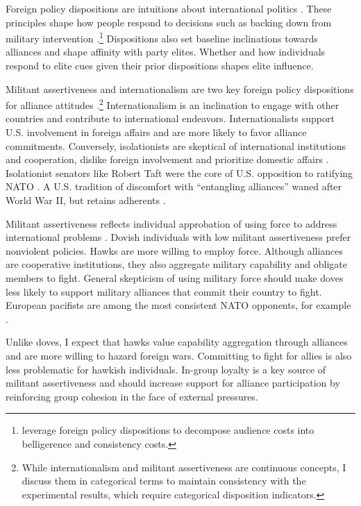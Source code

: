 \documentclass[12pt]{article}
\begin{document}
Foreign policy dispositions are intuitions about international politics \citep{KertzerTingley2018}. 
These principles shape how people respond to decisions such as backing down from military intervention \citep{KertzerBrutger2016}.\footnote{\citet{KertzerBrutger2016} leverage foreign policy dispositions to decompose audience costs into belligerence and consistency costs.}
Dispositions also set baseline inclinations towards alliances and shape affinity with party elites.
Whether and how individuals respond to elite cues given their prior dispositions shapes elite influence. 


Militant assertiveness and internationalism are two key foreign policy dispositions for alliance attitudes \citep{Herrmannetal1999}.\footnote{While internationalism and militant assertiveness are continuous concepts, I discuss them in categorical terms to maintain consistency with the experimental results, which require categorical disposition indicators.}
Internationalism is an inclination to engage with other countries and contribute to international endeavors. 
Internationalists support U.S. involvement in foreign affairs and are more likely to favor alliance commitments. 
Conversely, isolationists are skeptical of international institutions and cooperation, dislike foreign involvement and prioritize domestic affairs \citep{Kertzer2013}. 
Isolationist senators like Robert Taft were the core of U.S. opposition to ratifying NATO \citep{Kaplan2007}.
A U.S. tradition of discomfort with ``entangling alliances'' waned after World War II, but retains adherents \citep{Kupchan2020}.


Militant assertiveness reflects individual approbation of using force to address international problems \citep{Herrmannetal1999}. 
Dovish individuals with low militant assertiveness prefer nonviolent policies.
Hawks are more willing to employ force.
Although alliances are cooperative institutions, they also aggregate military capability and obligate members to fight.
General skepticism of using military force should make doves less likely to support military alliances that commit their country to fight.  
European pacifists are among the most consistent NATO opponents, for example \citep{Thies2015}.


Unlike doves, I expect that hawks value capability aggregation through alliances and are more willing to hazard foreign wars. 
Committing to fight for allies is also less problematic for hawkish individuals. 
In-group loyalty is a key source of militant assertiveness \citep{Kertzeretal2014} and should increase support for alliance participation by reinforcing group cohesion in the face of external pressures.
\end{document}
